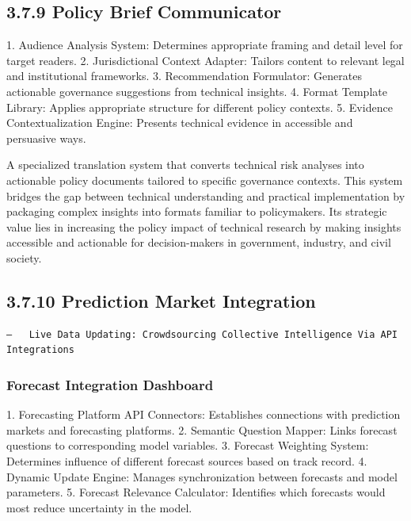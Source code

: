 \documentclass[
  11pt,
  letterpaper,
]{book}
\begin{document}
\subsection*{\texorpdfstring{3.7.9 \textbf{Policy Brief
Communicator}}{3.7.9 Policy Brief Communicator}}\label{policy-brief-communicator}

1. Audience Analysis System: Determines appropriate framing and detail
level for target readers. 2. Jurisdictional Context Adapter: Tailors
content to relevant legal and institutional frameworks. 3.
Recommendation Formulator: Generates actionable governance suggestions
from technical insights. 4. Format Template Library: Applies appropriate
structure for different policy contexts. 5. Evidence Contextualization
Engine: Presents technical evidence in accessible and persuasive ways.

A specialized translation system that converts technical risk analyses
into actionable policy documents tailored to specific governance
contexts. This system bridges the gap between technical understanding
and practical implementation by packaging complex insights into formats
familiar to policymakers. Its strategic value lies in increasing the
policy impact of technical research by making insights accessible and
actionable for decision-makers in government, industry, and civil
society.

\subsection*{3.7.10 Prediction Market
Integration}\label{prediction-market-integration}

\begin{verbatim}
—   Live Data Updating: Crowdsourcing Collective Intelligence Via API Integrations
\end{verbatim}

\subsubsection*{\texorpdfstring{\textbf{Forecast Integration
Dashboard}}{Forecast Integration Dashboard}}\label{forecast-integration-dashboard}

1. Forecasting Platform API Connectors: Establishes connections with
prediction markets and forecasting platforms. 2. Semantic Question
Mapper: Links forecast questions to corresponding model variables. 3.
Forecast Weighting System: Determines influence of different forecast
sources based on track record. 4. Dynamic Update Engine: Manages
synchronization between forecasts and model parameters. 5. Forecast
Relevance Calculator: Identifies which forecasts would most reduce
uncertainty in the model.
\end{document}
